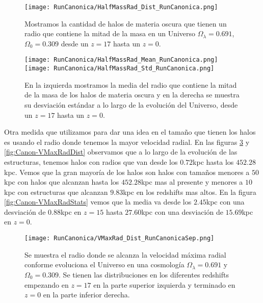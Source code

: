 \begin{figure}[H]
    \centering
    \texttt{[image: RunCanonica/HalfMassRad\_Dist\_RunCanonica.png]}
    \caption[Distribución del radio que contiene la mitad de la masa]{\footnotesize Mostramos la cantidad de halos de materia oscura que tienen un radio que contiene la mitad de la masa en un Universo $\Omega_\lambda = 0.691 $, $\Omega_0 = 0.309$ desde un $z=17$ hasta un $z=0$.}
    \label{fig:Canon-HalfMassRadDist}
\end{figure}

\begin{figure}[H]
    \centering
    \texttt{[image: RunCanonica/HalfMassRad\_Mean\_RunCanonica.png]}
    \texttt{[image: RunCanonica/HalfMassRad\_Std\_RunCanonica.png]}
    \caption[Media y desviación estándar del radio de la mitad de la masa]{\footnotesize En la izquierda mostramos la media del radio que contiene la mitad de la masa de los halos de materia oscura y en la derecha se muestra su desviación estándar a lo largo de la evolución del Universo, desde un $z=17$ hasta un $z=0$.}
    \label{fig:Canon-HalfMassRadStats}
\end{figure}

Otra medida que utilizamos para dar una idea en el tamaño que tienen los halos es usando el radio donde tenemos la mayor velocidad radial. En las figuras \ref{fig:Canon-VMaxRadDistSep} y \ref{fig:Canon-VMaxRadDist} observamos que a lo largo de la evolución de las estructuras, tenemos halos con radios que van desde los $0.72$kpc hasta los $452.28$kpc. Vemos que la gran mayoría de los halos son halos con tamaños menores a $50$kpc con halos que alcanzan hasta los $452.28$kpc mas al presente y menores a $10$kpc con estructuras que alcanzan $9.83$kpc en los redshifts mas altos. En la figura \ref{fig:Canon-VMaxRadStats} vemos que la media va desde los $2.45$kpc con una desviación de $0.88$kpc en $z=15$ hasta $27.60$kpc con una desviación de $15.69$kpc en $z=0$.

\begin{figure}[H]
    \centering
    \texttt{[image: RunCanonica/VMaxRad\_Dist\_RunCanonicaSep.png]}
    \caption[Radio donde se alcanza la velocidad máxima radial]{\footnotesize Se muestra el radio donde se alcanza la velocidad máxima radial conforme evoluciona el Universo en una cosmología $\Omega_\lambda = 0.691 $ y $\Omega_0 = 0.309$. Se tienen las distribuciones en los diferentes redshifts empezando en $z=17$ en la parte superior izquierda y terminado en $z=0$ en la parte inferior derecha.}
    \label{fig:Canon-VMaxRadDistSep}
\end{figure}

